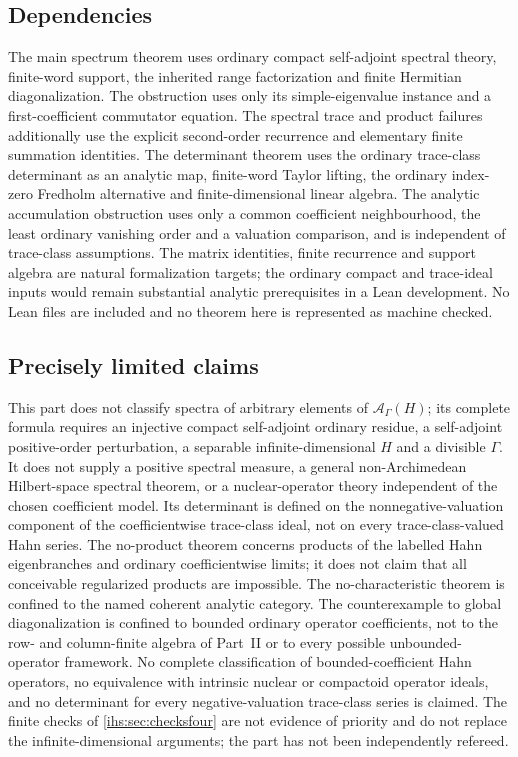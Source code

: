 \documentclass[11pt,a4paper]{article}
\numberwithin{equation}{section}
\theoremstyle{definition}
\theoremstyle{remark}
\newcommand{\Ahh}{\mathcal A_\Gamma(H)}
\begin{document}
\subsection{Dependencies}\label{ihs:fr:sec:dependencies}
The main spectrum theorem uses ordinary compact self-adjoint spectral theory,
finite-word support, the inherited range factorization and finite Hermitian
diagonalization. The obstruction uses only its simple-eigenvalue instance and
a first-coefficient commutator equation. The spectral trace and product
failures additionally use the explicit second-order recurrence and
elementary finite summation identities. The determinant theorem uses the
ordinary trace-class determinant as an analytic map, finite-word Taylor
lifting, the ordinary index-zero Fredholm alternative and finite-dimensional
linear algebra. The analytic accumulation obstruction uses only a common
coefficient neighbourhood, the least ordinary vanishing order and a
valuation comparison, and is independent of trace-class assumptions. The
matrix identities, finite recurrence and support algebra are natural
formalization targets; the ordinary compact and trace-ideal inputs would
remain substantial analytic prerequisites in a Lean development. No Lean
files are included and no theorem here is represented as machine checked.

\subsection{Precisely limited claims}\label{ihs:fr:sec:nonclaims}
This part does not classify spectra of arbitrary elements of $\Ahh$; its
complete formula requires an injective compact self-adjoint ordinary residue,
a self-adjoint positive-order perturbation, a separable infinite-dimensional
$H$ and a divisible $\Gamma$. It does not supply a positive spectral measure,
a general non-Archimedean Hilbert-space spectral theorem, or a
nuclear-operator theory independent of the chosen coefficient model. Its
determinant is defined on the nonnegative-valuation component of the
coefficientwise trace-class ideal, not on every trace-class-valued Hahn
series. The no-product theorem concerns products of the labelled Hahn
eigenbranches and ordinary coefficientwise limits; it does not claim that all
conceivable regularized products are impossible. The no-characteristic
theorem is confined to the named coherent analytic category. The
counterexample to global diagonalization is confined to bounded ordinary
operator coefficients, not to the row- and column-finite algebra of Part~II
or to every possible unbounded-operator framework. No complete
classification of bounded-coefficient Hahn operators, no equivalence with
intrinsic nuclear or compactoid operator ideals, and no determinant for every
negative-valuation trace-class series is claimed. The finite checks of
\cref{ihs:sec:checksfour} are not evidence of priority and do not replace
the infinite-dimensional arguments; the part has not been independently
refereed.
\end{document}
